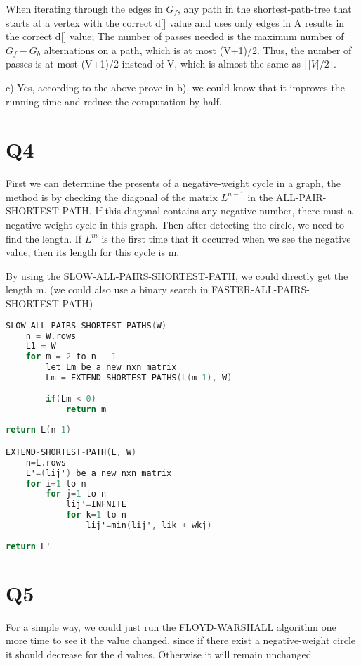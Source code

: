 \documentclass{article}
\begin{document}
When iterating through the edges in $G_{f}$, any path in the shortest-path-tree that starts at a vertex with the correct d[] value and uses only edges in A results in the correct d[] value; The number of passes needed is the maximum number of $G_{f}-G_{b}$ alternations on a path, which is at most (V+1)/2. Thus, the number of passes is at most (V+1)/2 instead of V, which is almost the same as $\lceil|V|/2\rceil$. %

c) Yes, according to the above prove in b), we could know that it improves the running time and reduce the computation by half.

\section{Q4}

First we can determine the presents of a negative-weight cycle in a graph, the method is by checking the diagonal of
the matrix $L^{n-1}$ in the ALL-PAIR-SHORTEST-PATH. If this diagonal contains any negative number, there must a negative-weight cycle in this graph. Then after detecting the circle, we need to find the length. If $L^{m}$ is the
first time that it occurred when we see the negative value, then its length for this cycle is m.

By using the SLOW-ALL-PAIRS-SHORTEST-PATH, we could directly get the length m. (we could also use a binary search in
FASTER-ALL-PAIRS-SHORTEST-PATH)

\begin{lstlisting}[language=C]
SLOW-ALL-PAIRS-SHORTEST-PATHS(W)
	n = W.rows
	L1 = W
	for m = 2 to n - 1
		let Lm be a new nxn matrix
		Lm = EXTEND-SHORTEST-PATHS(L(m-1), W)
		
		if(Lm < 0)
			return m
				
return L(n-1)

EXTEND-SHORTEST-PATH(L, W)
	n=L.rows
	L'=(lij') be a new nxn matrix
	for i=1 to n
		for j=1 to n
			lij'=INFNITE
			for k=1 to n
				lij'=min(lij', lik + wkj)
				
return L'

\end{lstlisting}

\section{Q5}
For a simple way, we could just run the FLOYD-WARSHALL algorithm one more time to see it the value changed, since if there exist a negative-weight circle it should decrease for the d values. Otherwise it will remain unchanged.
\end{document}
